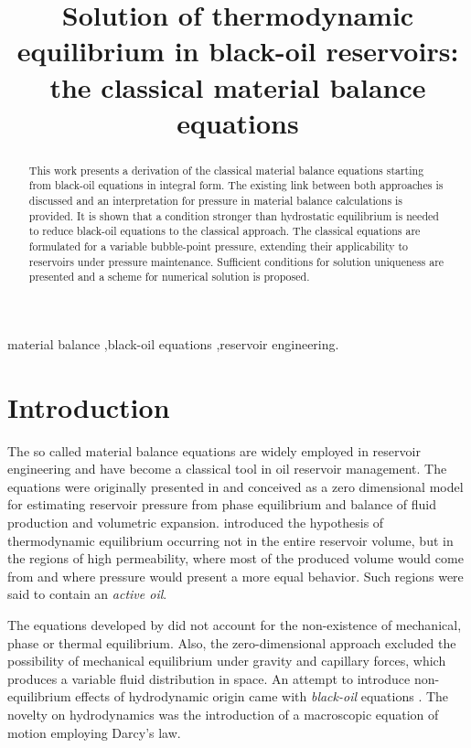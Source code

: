 \documentclass[authoryear,preprint,review,12pt]{elsarticle}
\begin{document}
\begin{frontmatter}
\title{Solution of thermodynamic equilibrium in black-oil reservoirs: the classical material balance equations}


\begin{abstract}
This work presents a derivation of the classical material balance equations starting from black-oil equations in integral form. The existing link between both approaches is discussed and an interpretation for pressure in material balance calculations is provided. It is shown that a condition stronger than hydrostatic equilibrium is needed to reduce black-oil equations to the classical approach. The classical equations are formulated for a variable bubble-point pressure, extending their applicability to reservoirs under pressure maintenance. Sufficient conditions for solution uniqueness are presented and a scheme for numerical solution is proposed.
\end{abstract}

\begin{keyword}
material balance \sep black-oil equations \sep reservoir engineering.
\end{keyword}
\end{frontmatter}

\section{Introduction}
The so called material balance equations are widely employed in reservoir engineering and have become a classical tool in oil reservoir management. The equations were originally presented in \cite{schilthuis1936active} and conceived as a zero dimensional model for estimating reservoir pressure from phase equilibrium and balance of fluid production and volumetric expansion. \cite{schilthuis1936active} introduced the hypothesis of thermodynamic equilibrium occurring not in the entire reservoir volume, but in the regions of high permeability, where most of the produced volume would come from and where pressure would present a more equal behavior. Such regions were said to contain an \textit{active oil}.

The equations developed by \cite{schilthuis1936active} did not account for the non-existence of mechanical, phase or thermal equilibrium. Also, the zero-dimensional approach excluded the possibility of mechanical equilibrium under gravity and capillary forces, which produces a variable fluid distribution in space. An attempt to introduce non-equilibrium effects of hydrodynamic origin came with \textit{black-oil} equations \citep{aziz1979petroleum,blackoil}. The novelty on hydrodynamics was the introduction of a macroscopic equation of motion employing Darcy's law.
\end{document}
